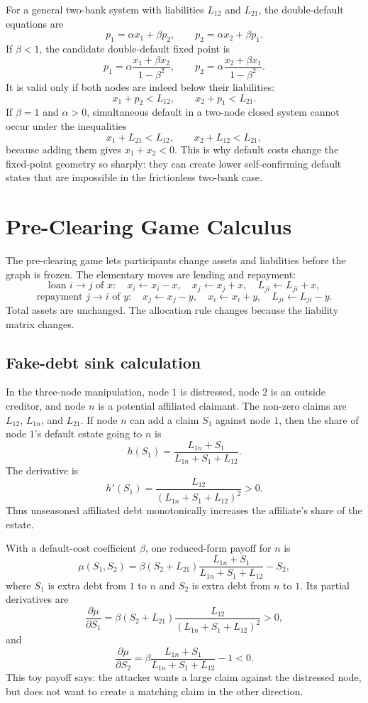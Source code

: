 \documentclass[11pt,oneside]{article}
\begin{document}
For a general two-bank system with liabilities $L_{12}$ and $L_{21}$, the
double-default equations are
\[
  p_1=\alpha x_1+\beta p_2,\qquad
  p_2=\alpha x_2+\beta p_1.
\]
If $\beta<1$, the candidate double-default fixed point is
\[
  p_1=\alpha\frac{x_1+\beta x_2}{1-\beta^2},
  \qquad
  p_2=\alpha\frac{x_2+\beta x_1}{1-\beta^2}.
\]
It is valid only if both nodes are indeed below their liabilities:
\[
  x_1+p_2<L_{12},\qquad x_2+p_1<L_{21}.
\]
If $\beta=1$ and $\alpha>0$, simultaneous default in a two-node closed system
cannot occur under the inequalities
\[
  x_1+L_{21}<L_{12},\qquad x_2+L_{12}<L_{21},
\]
because adding them gives $x_1+x_2<0$. This is why default costs change the
fixed-point geometry so sharply: they can create lower self-confirming default
states that are impossible in the frictionless two-bank case.

\section{Pre-Clearing Game Calculus}

The pre-clearing game lets participants change assets and liabilities before
the graph is frozen. The elementary moves are lending and repayment:
\[
  \text{loan } i\to j\text{ of }x:
  \quad
  x_i\leftarrow x_i-x,\quad
  x_j\leftarrow x_j+x,\quad
  L_{ji}\leftarrow L_{ji}+x,
\]
\[
  \text{repayment } j\to i\text{ of }y:
  \quad
  x_j\leftarrow x_j-y,\quad
  x_i\leftarrow x_i+y,\quad
  L_{ji}\leftarrow L_{ji}-y.
\]
Total assets are unchanged. The allocation rule changes because the liability
matrix changes.

\subsection{Fake-debt sink calculation}

In the three-node manipulation, node $1$ is distressed, node $2$ is an outside
creditor, and node $n$ is a potential affiliated claimant. The non-zero claims
are $L_{12}$, $L_{1n}$, and $L_{21}$. If node $n$ can add a claim $S_1$ against
node $1$, then the share of node $1$'s default estate going to $n$ is
\[
  h(S_1)=
  \frac{L_{1n}+S_1}{L_{1n}+S_1+L_{12}}.
\]
The derivative is
\[
  h'(S_1)=
  \frac{L_{12}}{(L_{1n}+S_1+L_{12})^2}>0.
\]
Thus unseasoned affiliated debt monotonically increases the affiliate's share
of the estate.

With a default-cost coefficient $\beta$, one reduced-form payoff for $n$ is
\[
  \mu(S_1,S_2)=
  \beta(S_2+L_{21})
  \frac{L_{1n}+S_1}{L_{1n}+S_1+L_{12}}
  -S_2,
\]
where $S_1$ is extra debt from $1$ to $n$ and $S_2$ is extra debt from $n$ to
$1$. Its partial derivatives are
\[
  \frac{\partial\mu}{\partial S_1}
  =
  \beta(S_2+L_{21})
  \frac{L_{12}}{(L_{1n}+S_1+L_{12})^2}>0,
\]
and
\[
  \frac{\partial\mu}{\partial S_2}
  =
  \beta
  \frac{L_{1n}+S_1}{L_{1n}+S_1+L_{12}}
  -1<0.
\]
This toy payoff says: the attacker wants a large claim against the distressed
node, but does not want to create a matching claim in the other direction.
\end{document}
